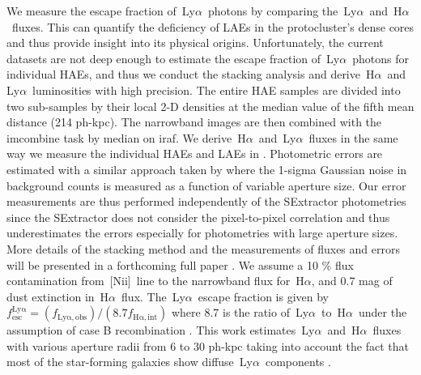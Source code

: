 \documentclass[letters,usenatbib]{mnras}
\def\lya{{\rm\,Ly$\alpha$}}
\def\ha{{\rm\,H$\alpha$}}
\def\nii{{\rm\,[N{\sc ii}]}}
\begin{document}
We measure the escape fraction of \lya\ photons by comparing the \lya\ and \ha\ 
fluxes. This can quantify the deficiency of LAEs in the protocluster's dense cores 
and thus provide insight into its physical origins. Unfortunately, the current 
datasets are not deep enough to estimate the escape fraction of \lya\ photons for 
individual HAEs, and thus we conduct the stacking analysis and derive \ha\ and 
\lya\ luminosities with high precision. The entire HAE samples are divided into 
two sub-samples by their local 2-D densities at the median value of the fifth mean 
distance (214 ph-kpc). The narrowband images are then combined with the 
{\sc imcombine} task by median on {\sc iraf}\footnotemark[2]. We derive \ha\ and 
\lya\ fluxes in the same way we measure the individual HAEs and LAEs in 
\citet{Hayashi:2016,Shimakawa:2016}. Photometric errors are estimated with a 
similar approach taken by \citet{Skelton:2014} where the 1-sigma Gaussian noise in 
background counts is measured as a function of variable aperture size. Our error 
measurements are thus performed independently of the SExtractor photometries since 
the SExtractor does not consider the pixel-to-pixel correlation and thus 
underestimates the errors especially for photometries with large aperture sizes. 
More details of the stacking method and the measurements of fluxes and errors will 
be presented in a forthcoming full paper \citep{Shimakawa:2017b}. We assume a 10 
\% flux contamination from \nii\ line to the narrowband flux for \ha, and 0.7 mag 
of dust extinction in \ha\ flux. The \lya\ escape fraction is given by 
$f_\mathrm{esc}^\mathrm{Ly\alpha} = (f_\mathrm{Ly\alpha,obs})/(8.7 f_\mathrm{H\alpha,int})$ 
where 8.7 is the ratio of \lya\ to \ha\ under the assumption of case B 
recombination \citep{Brocklehurst:1971}. This work estimates \lya\ and \ha\ fluxes 
with various aperture radii from 6 to 30 ph-kpc taking into account the fact that 
most of the star-forming galaxies show diffuse \lya\ components 
\citep{Ostlin:2009,Steidel:2011,Hayes:2013b}. 

\end{document}
